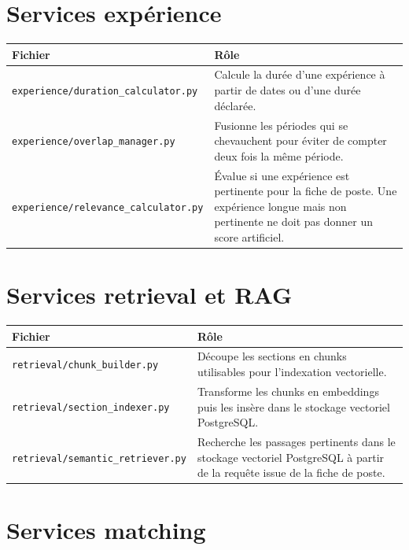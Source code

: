 \documentclass[12pt,a4paper]{report}
\begin{document}
\section{Services expérience}

\begin{longtable}{|p{5cm}|p{9cm}|}
\hline
\textbf{Fichier} & \textbf{Rôle} \\
\hline
\endhead
\texttt{experience/duration\_calculator.py} & Calcule la durée d'une expérience à partir de dates ou d'une durée déclarée. \\
\hline
\texttt{experience/overlap\_manager.py} & Fusionne les périodes qui se chevauchent pour éviter de compter deux fois la même période. \\
\hline
\texttt{experience/relevance\_calculator.py} & Évalue si une expérience est pertinente pour la fiche de poste. Une expérience longue mais non pertinente ne doit pas donner un score artificiel. \\
\hline
\end{longtable}

\section{Services retrieval et RAG}

\begin{longtable}{|p{5cm}|p{9cm}|}
\hline
\textbf{Fichier} & \textbf{Rôle} \\
\hline
\endhead
\texttt{retrieval/chunk\_builder.py} & Découpe les sections en chunks utilisables pour l'indexation vectorielle. \\
\hline
\texttt{retrieval/section\_indexer.py} & Transforme les chunks en embeddings puis les insère dans le stockage vectoriel PostgreSQL. \\
\hline
\texttt{retrieval/semantic\_retriever.py} & Recherche les passages pertinents dans le stockage vectoriel PostgreSQL à partir de la requête issue de la fiche de poste. \\
\hline
\end{longtable}

\section{Services matching}
\end{document}
